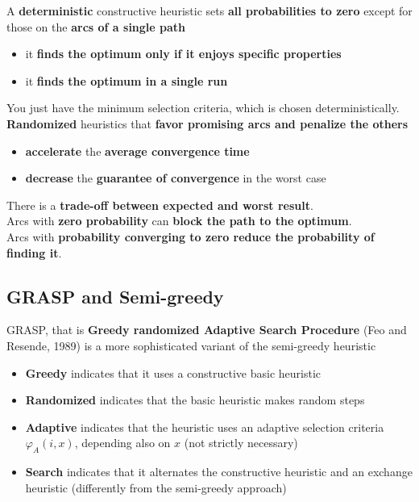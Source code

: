A \textbf{deterministic} constructive heuristic sets \textbf{all probabilities to zero} except for those on the \textbf{arcs of a single path}
\begin{itemize}
	\item it \textbf{finds the optimum only if it enjoys specific properties}
	\item it \textbf{finds the optimum in a single run}
\end{itemize} 
You just have the minimum selection criteria, which is chosen deterministically.\\


\textbf{Randomized} heuristics that \textbf{favor promising arcs and penalize the others}
\begin{itemize}
	\item \textbf{accelerate} the \textbf{average convergence time}
	\item \textbf{decrease} the \textbf{guarantee of convergence} in the worst case
\end{itemize}

There is a \textbf{trade-off between expected and worst result}.\\

Arcs with \textbf{zero probability} can \textbf{block the path to the optimum}.\\
Arcs with \textbf{probability converging to zero reduce the probability of finding it}.\\

\newpage

\subsection{GRASP and Semi-greedy}
GRASP, that is \textbf{Greedy randomized Adaptive Search Procedure} (Feo and Resende, 1989) is a more sophisticated variant of the semi-greedy heuristic
\begin{itemize}
	\item \textbf{Greedy} indicates that it uses a constructive basic heuristic
	
	\item \textbf{Randomized} indicates that the basic heuristic makes random steps
	
	\item \textbf{Adaptive} indicates that the heuristic uses an adaptive selection criteria $\varphi_A (i, x)$, depending also on $x$ (not strictly necessary)
	
	\item \textbf{Search} indicates that it alternates the constructive heuristic and an exchange heuristic (differently from the semi-greedy approach)
\end{itemize}

